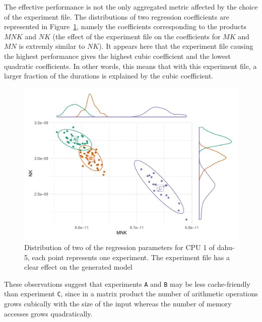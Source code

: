             The effective performance is not the only aggregated metric affected by the choice of the experiment file.
            The distributions of two regression coefficients are represented in
            Figure~\ref{fig:randomizing_sizes:expfile:average_distribution}, namely the coefficients corresponding to
            the products \(MNK\) and \(NK\) (the effect of the experiment file on the coefficients for \(MK\) and \(MN\)
            is extremly similar to \(NK\)). It appears here that the experiment file causing the highest performance
            gives the highest cubic coefficient and the lowest quadratic coefficients. In other words, this means that
            with this experiment file, a larger fraction of the \dgemm durations is explained by the cubic coefficient.

            \begin{figure}[htpb]
                \centering
                \includegraphics[width=\linewidth]{img/experiment/randomizing_sizes/expfile/average_distribution.pdf}
                \caption{Distribution of two of the regression parameters for CPU 1 of dahu-5, each point represents one
                experiment. The experiment file has a clear effect on the generated model}%
                \label{fig:randomizing_sizes:expfile:average_distribution}
            \end{figure}

            These observations suggest that experiments \texttt{A} and \texttt{B} may be less cache-friendly than
            experiment \texttt{C}, since in a matrix product the number of arithmetic operations grows cubically with
            the size of the input whereas the number of memory accesses grows quadratically.

